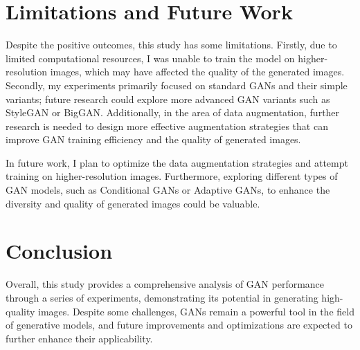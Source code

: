 \section{Limitations and Future Work}
Despite the positive outcomes, this study has some limitations. Firstly, due to limited computational resources, 
I was unable to train the model on higher-resolution images, which may have affected the quality of the generated 
images. Secondly, my experiments primarily focused on standard GANs and their simple variants; future research 
could explore more advanced GAN variants such as StyleGAN or BigGAN. Additionally, in the area of data augmentation, 
further research is needed to design more effective augmentation strategies that can improve GAN training efficiency and the quality of generated images.

In future work, I plan to optimize the data augmentation strategies and attempt training on higher-resolution images. 
Furthermore, exploring different types of GAN models, such as Conditional GANs or Adaptive GANs, to enhance the diversity 
and quality of generated images could be valuable.

\section{Conclusion}
Overall, this study provides a comprehensive analysis of GAN performance through a series of experiments, demonstrating 
its potential in generating high-quality images. Despite some challenges, GANs remain a powerful tool in the field of 
generative models, and future improvements and optimizations are expected to further enhance their applicability.